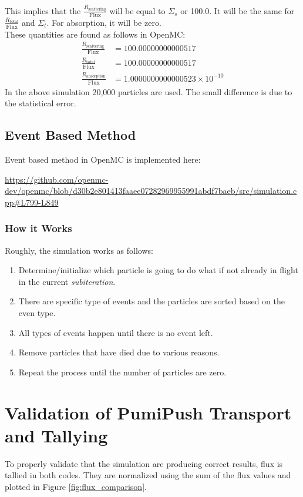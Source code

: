 \documentclass{article}
\begin{document}
This implies that the $\frac{R_{\text{scattering}}}{\text{Flux}}$ will be equal to $\Sigma_s$ or 100.0. It will be the same for
$\frac{R_{\text{total}}}{\text{Flux}}$ and $\Sigma_t$. For absorption, it will be zero.
\\

These quantities are found as follows in OpenMC:
\begin{align}
	\frac{R_{\text{scattering}}}{\text{Flux}} & = 100.00000000000517                 \\
	\frac{R_{\text{total}}}{\text{Flux}}      & = 100.00000000000517                 \\
	\frac{R_{\text{absorption}}}{\text{Flux}} & = 1.0000000000000523 \times 10^{-10}
\end{align}
In the above simulation 20,000 particles are used. The small difference is due to the statistical error.



\subsection{Event Based Method}
Event based method in OpenMC is implemented here:
\begin{tcolorbox}[colback=white, colframe=black, title=Event Based Method Code]
	\url{https://github.com/openmc-dev/openmc/blob/d30b2e801413faaee07282969955991abdf7baeb/src/simulation.cpp#L799-L849}
\end{tcolorbox}

\subsubsection*{How it Works}
Roughly, the simulation works as follows:
\begin{enumerate}
	\item Determine/initialize which particle is going to do what if not already in flight in the current \textit{subiteration}.
	\item There are specific type of events and the particles are sorted based on the even type.
	\item All types of events happen until there is no event left.
	\item Remove particles that have died due to various reasons.
	\item Repeat the process until the number of particles are zero.
\end{enumerate}

\newpage
\section{Validation of PumiPush Transport and Tallying}
To properly validate that the simulation are producing correct results, flux is tallied in both codes. They are normalized
using the sum of the flux values and plotted in Figure \ref{fig:flux_comparison}.
\end{document}

